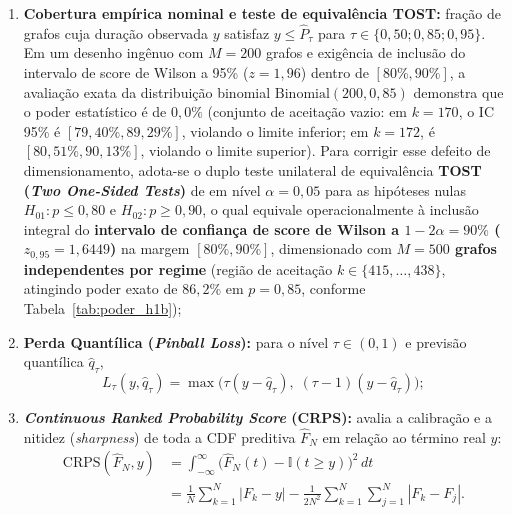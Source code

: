\documentclass[12pt,openany,oneside,a4paper,english,brazilian,sumario=tradicional]{abntex2}
\begin{document}
\begin{itemize}
\begin{enumerate}
    \item \textbf{Cobertura empírica nominal e teste de equivalência TOST:} fração de grafos cuja duração observada $y$ satisfaz $y \le \hat{P}_{\tau}$ para $\tau \in \{0{,}50; 0{,}85; 0{,}95\}$. Em um desenho ingênuo com $M=200$ grafos e exigência de inclusão do intervalo de score de Wilson a 95\% ($z=1{,}96$) dentro de $[80\%, 90\%]$, a avaliação exata da distribuição binomial $\mathrm{Binomial}(200, 0{,}85)$ demonstra que o poder estatístico é de \textbf{$0{,}0\%$} (conjunto de aceitação vazio: em $k=170$, o IC 95\% é $[79{,}40\%, 89{,}29\%]$, violando o limite inferior; em $k=172$, é $[80{,}51\%, 90{,}13\%]$, violando o limite superior). Para corrigir esse defeito de dimensionamento, adota-se o duplo teste unilateral de equivalência \textbf{TOST (\textit{Two One-Sided Tests})} de  em nível $\alpha=0{,}05$ para as hipóteses nulas $H_{01}\colon p \le 0{,}80$ e $H_{02}\colon p \ge 0{,}90$, o qual equivale operacionalmente à inclusão integral do \textbf{intervalo de confiança de score de Wilson a $1 - 2\alpha = 90\%$ ($z_{0{,}95} = 1{,}6449$)} na margem $[80\%, 90\%]$, dimensionado com \textbf{$M=500$ grafos independentes por regime} (região de aceitação $k \in \{415,\dots,438\}$, atingindo poder exato de \textbf{$86{,}2\%$} em $p=0{,}85$, conforme Tabela~\ref{tab:poder_h1b});
    \item \textbf{Perda Quantílica (\textit{Pinball Loss}):} para o nível $\tau \in (0,1)$ e previsão quantílica $\hat{q}_\tau$,
    \begin{equation}
    L_{\tau}(y, \hat{q}_\tau) = \max\big(\tau(y - \hat{q}_\tau),\; (\tau - 1)(y - \hat{q}_\tau)\big);
    \end{equation}
    \item \textbf{\textit{Continuous Ranked Probability Score} (CRPS):} avalia a calibração e a nitidez (\textit{sharpness}) de toda a CDF preditiva $\hat{F}_N$ em relação ao término real $y$:
    \begin{equation}
    \begin{aligned}
    \mathrm{CRPS}(\hat{F}_N, y) &= \int_{-\infty}^{\infty} \big(\hat{F}_N(t) - \mathbb{I}(t \ge y)\big)^2\,dt \\
    &= \frac{1}{N}\sum_{k=1}^N |F_k - y| - \frac{1}{2N^2}\sum_{k=1}^N\sum_{j=1}^N |F_k - F_j|.
    \end{aligned}
    \end{equation}
  \end{enumerate}
\end{itemize}
\end{document}
